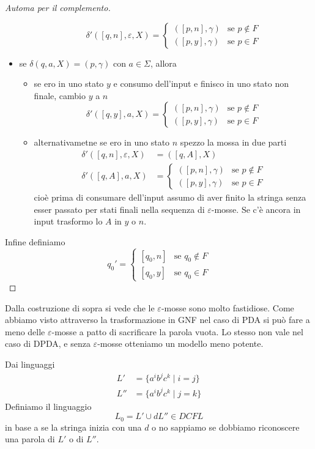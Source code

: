 \documentclass[12pt]{report}
\theoremstyle{definition}
\theoremstyle{regard}
\begin{document}
\begin{proof}[Automa per il complemento]
\begin{itemize}
\begin{itemize}
				$$\delta'([q, n], \varepsilon, X) = \begin{cases} ([p, n], \gamma) & \text{se } p \not \in F \\ ([p, y], \gamma) & \text{se } p \in F \end{cases}$$
		\end{itemize}
	\item se $\delta(q, a, X) = (p, \gamma)$ con $a \in \Sigma$, allora
		\begin{itemize}
			\item se ero in uno stato $y$ e consumo dell'input e finisco in uno stato non finale, cambio $y$ a $n$
				$$\delta'([q, y], a, X) = \begin{cases} ([p, n], \gamma) & \text{se } p \not \in F \\ ([p, y], \gamma) & \text{se } p \in F \end{cases}$$
			\item alternativametne se ero in uno stato $n$ spezzo la mossa in due parti
				\begin{align*}
					\delta'([q, n], \varepsilon, X) &= ([q, A], X) \\
					\delta'([q, A], a, X) &= \begin{cases} ([p, n], \gamma) & \text{se } p \not \in F \\ ([p, y], \gamma) & \text{se } p \in F \end{cases}
				\end{align*}
				cioè prima di consumare dell'input assumo di aver finito la stringa senza esser passato per stati finali nella sequenza di $\varepsilon$-mosse.
				Se c'è ancora in input trasformo lo $A$ in $y$ o $n$.
		\end{itemize}
\end{itemize}
Infine definiamo
$$ q_0' = \begin{cases} [q_0, n] & \text{se } q_0 \not \in F \\ [q_0, y] & \text{se } q_0 \in F \end{cases} $$
\end{proof}

Dalla costruzione di sopra si vede che le $\varepsilon$-mosse sono molto fastidiose.
Come abbiamo visto attraverso la trasformazione in GNF nel caso di PDA si può fare a meno delle $\varepsilon$-mosse a patto di sacrificare la parola vuota.
Lo stesso non vale nel caso di DPDA, e senza $\varepsilon$-mosse otteniamo un modello meno potente.

Dai linguaggi 
\begin{align*}
	L' &= \{ a^i b^j c^k \mid i = j \} \\
	L'' &= \{ a^i b^j c^k \mid j = k \}
\end{align*}
Definiamo il linguaggio 
$$ L_0 = L' \cup dL'' \in DCFL $$
in base a se la stringa inizia con una $d$ o no sappiamo se dobbiamo riconoscere una parola di $L'$ o di $L''$.
\end{document}
